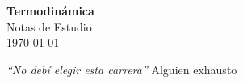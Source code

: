 \documentclass[12pt,a4paper]{scrbook}
\begin{document}
\begin{titlepage}
  \centering
  \vspace*{6cm}
  {\fontsize{36}{89}\selectfont\bfseries\color{white} Termodinámica}\\[2em]
  {\Large\color{white!90} Notas de Estudio}\\[2em]
  {\large\color{white!60} \today}
\end{titlepage}

\clearpage
\thispagestyle{empty}
\vspace*{2cm}
\begin{center}
\Large
\parbox{10cm}{
\begin{raggedright}
\textit{
“No debí elegir esta carrera”}
\vspace{.5cm}\hfill{ \-\-\- Alguien exhausto}

\end{raggedright}}
\end{center}
\clearpage

\tableofcontents








\nocite{*}
\printbibliography
\end{document}
